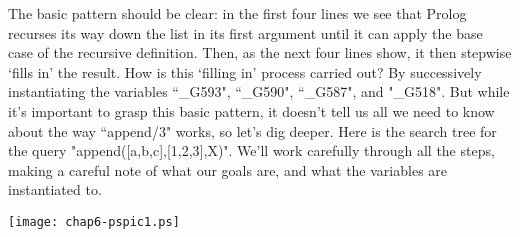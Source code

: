 The basic pattern should be clear: in the first four lines we see that
Prolog recurses its way down the list in its first argument until it
can apply the base case of the recursive definition.  Then, as the
next four lines show, it then stepwise `fills in' the result.  How is
this `filling in' process carried out?  By successively instantiating
the variables ``\_G593", ``\_G590", ``\_G587", and
"\_G518". But while it's important to grasp this basic pattern, it
doesn't tell us all we need to know about the way ``append/3" works,
so let's dig deeper. Here is the search tree for the query
"append([a,b,c],[1,2,3],X)". We'll work carefully through
all the steps, making a careful note of what our goals are,
and what the variables are instantiated to.

\begin{center}
\texttt{[image: chap6-pspic1.ps]}
\end{center}


